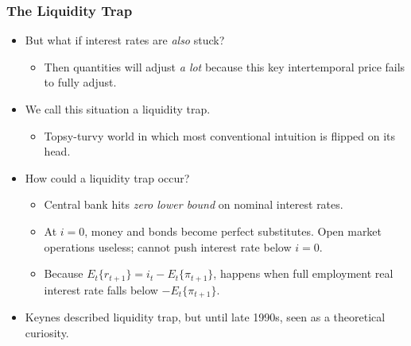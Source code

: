 \documentclass[english,xcolor=svgnames]{beamer}
\begin{document}
\begin{frame}
\frametitle{The Liquidity Trap}
\begin{itemize}
	\item But what if interest rates are \emph{also} stuck?
	\begin{itemize}
		\item Then quantities will adjust \emph{a lot} because this key intertemporal price fails to fully adjust.
	\end{itemize}
	\item We call this situation a liquidity trap.
	\begin{itemize}
		\item Topsy-turvy world in which most conventional intuition is
flipped on its head.
	\end{itemize}
	\item How could a liquidity trap occur?
	\begin{itemize}
		\item Central bank hits \emph{zero lower bound} on nominal interest rates.
		\item At $i=0$, money and bonds become perfect substitutes. Open market operations useless; cannot push interest rate below $i=0$.
		\item Because $E_t\{r_{t+1}\}=i_t-E_t\{\pi_{t+1}\}$, happens when full employment real interest rate falls below $-E_t\{\pi_{t+1}\}$.
	\end{itemize}
	\item Keynes described liquidity trap, but until late 1990s, seen as a theoretical curiosity.
\end{itemize}
\end{frame}
\end{document}
